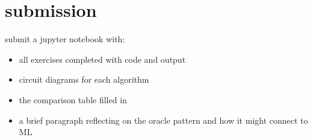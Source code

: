 \documentclass[11pt,a4paper]{article}
\theoremstyle{definition}
\theoremstyle{remark}
\newcounter{exercise}[section]
\begin{document}
\section{submission}

submit a jupyter notebook with:
\begin{itemize}[leftmargin=*]
  \item all exercises completed with code and output
  \item circuit diagrams for each algorithm
  \item the comparison table filled in
  \item a brief paragraph reflecting on the oracle pattern and how it might connect to ML
\end{itemize}
\end{document}
